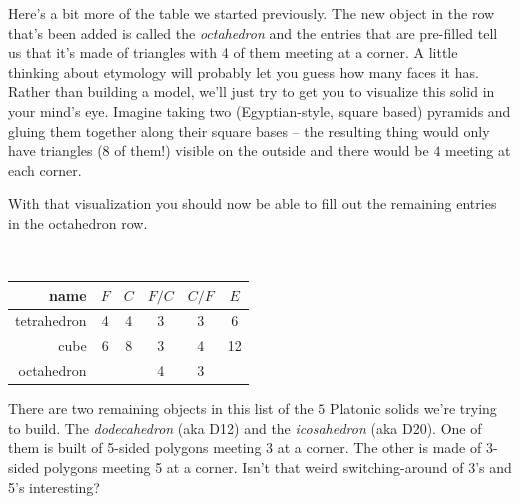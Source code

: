\vspace{.5in} 

\wbnewpage

Here's a bit more of the table we started previously. The new object in the row that's been added is called the {\em octahedron} and the entries that are pre-filled tell us that it's made of triangles with 4 of them meeting at a corner. A little thinking about etymology will probably let you guess how many faces it has.  Rather than building a model, we'll just try to get you to visualize this solid in your mind's eye.  Imagine taking two (Egyptian-style, square based) pyramids and gluing them together along their square bases -- the resulting thing would only have triangles (8 of them!) visible on the outside and there would be $4$ meeting at each corner.

With that visualization you should now be able to fill out the remaining entries in the octahedron row.

\

\setlength{\tabcolsep}{18pt}
\begin{tabular}{r|c|c|c|c|c} 
\bigstrut name        & $F$ & $C$ & $F/C$ & $C/F$ & $E$ \\ \hline
\bigstrut tetrahedron & 4   & 4   & 3     & 3     & 6 \\ \hline
\bigstrut cube        & 6   & 8   & 3     & 4     & 12 \\ \hline
\bigstrut octahedron  &     &     & 4     & 3     &   \\
\end{tabular}
\bigskip




\wbnewpage

There are two remaining objects in this list of the $5$ Platonic solids we're trying to build.
The {\em dodecahedron} (aka D12) and the {\em icosahedron} (aka D20).  One of them is built of 5-sided polygons meeting 3 at a corner.  The other is made of 3-sided polygons meeting 5 at a corner.  Isn't that weird switching-around of 3's and 5's interesting?

